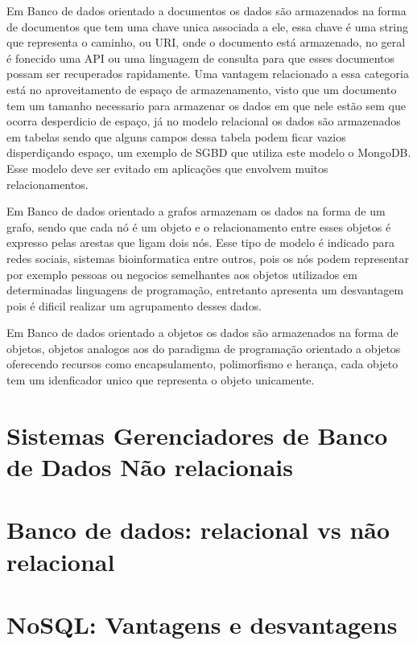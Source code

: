 \documentclass[12pt]{article}
\begin{document}
Em Banco de dados orientado a documentos os dados são armazenados na forma de documentos que tem uma chave unica associada a ele, essa chave é uma string que representa o caminho, ou URI, onde o documento está armazenado, no geral é fonecido uma API ou uma linguagem de consulta para que esses documentos possam ser recuperados rapidamente. \cite{surveyNosql:2012} Uma vantagem relacionado a essa categoria está no aproveitamento de espaço de armazenamento, visto que um documento tem um tamanho necessario para armazenar os dados em que nele estão sem que ocorra desperdicio de espaço, já no modelo relacional os dados são armazenados em tabelas sendo que alguns campos dessa tabela podem ficar vazios disperdiçando espaço, um exemplo de SGBD que utiliza este modelo o MongoDB. Esse modelo deve ser evitado em aplicações que envolvem muitos relacionamentos. \cite{typeNOSQL:2013}

Em Banco de dados orientado a grafos armazenam os dados na forma de um grafo, sendo que cada nó é um objeto e o relacionamento entre esses objetos é expresso pelas arestas que ligam dois nós. Esse tipo de modelo é indicado para redes sociais, sistemas bioinformatica entre outros, pois os nós podem representar por exemplo pessoas ou negocios semelhantes aos objetos utilizados em determinadas linguagens de programação, entretanto apresenta um desvantagem pois é dificil realizar um agrupamento desses dados.\cite{typeNOSQL:2013}\cite{surveyNosql:2012} 

Em Banco de dados orientado a objetos os dados são armazenados na forma de objetos, objetos analogos aos do paradigma de programação orientado a objetos oferecendo recursos como encapsulamento, polimorfismo e herança, cada objeto tem um idenficador unico que representa o objeto unicamente.\cite{typeNOSQL:2013}

\section{Sistemas Gerenciadores de Banco de Dados Não relacionais}

\section{Banco de dados: relacional vs não relacional}

\section{NoSQL: Vantagens e desvantagens}
\label{sec:vantagensedesvantagens}
\end{document}
